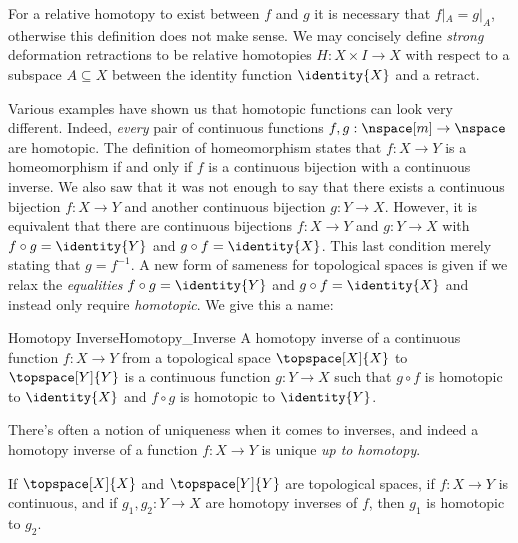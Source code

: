 \documentclass{book}                                                           %
\begin{document}
                For a relative homotopy to exist between $f$ and $g$ it is
                necessary that $f|_{A}=g|_{A}$, otherwise this definition does
                not make sense. We may concisely define \textit{strong}
                deformation retractions to be relative homotopies
                $H:X\times{I}\rightarrow{X}$ with respect to a subspace
                $A\subseteq{X}$ between the identity function $\identity{X}$ and
                a retract.
                \par\hfill\par
                Various examples have shown us that homotopic functions can look
                very different. Indeed, \textit{every} pair of continuous
                functions $f,g:\nspace[m]\rightarrow\nspace$ are homotopic. The
                definition of homeomorphism states that $f:X\rightarrow{Y}$ is
                a homeomorphism if and only if $f$ is a continuous bijection
                with a continuous inverse. We also saw that it was not enough to
                say that there exists a continuous bijection $f:X\rightarrow{Y}$
                and another continuous bijection $g:Y\rightarrow{X}$. However,
                it is equivalent that there are continuous bijections
                $f:X\rightarrow{Y}$ and $g:Y\rightarrow{X}$ with
                $f\circ{g}=\identity{Y}$ and $g\circ{f}=\identity{X}$. This last
                condition merely stating that $g=f^{\minus{1}}$. A new form of
                sameness for topological spaces is given if we relax the
                \textit{equalities} $f\circ{g}=\identity{Y}$ and
                $g\circ{f}=\identity{X}$ and instead only require
                \textit{homotopic}. We give this a name:
                \begin{fdefinition}{Homotopy Inverse}{Homotopy_Inverse}
                    A homotopy inverse of a continuous function
                    $f:X\rightarrow{Y}$ from a topological space
                    $\topspace[X]{X}$ to $\topspace[Y]{Y}$ is a continuous
                    function $g:Y\rightarrow{X}$ such that $g\circ{f}$ is
                    homotopic to $\identity{X}$ and $f\circ{g}$ is homotopic to
                    $\identity{Y}$.
                \end{fdefinition}
                There's often a notion of uniqueness when it comes to inverses,
                and indeed a homotopy inverse of a function $f:X\rightarrow{Y}$
                is unique \textit{up to homotopy}.
                \begin{theorem}
                    If $\topspace[X]{X}$ and $\topspace[Y]{Y}$ are topological
                    spaces, if $f:X\rightarrow{Y}$ is continuous, and if
                    $g_{1},g_{2}:Y\rightarrow{X}$ are homotopy inverses
                    of $f$, then $g_{1}$ is homotopic to ${g}_{2}$.
                \end{theorem}
\end{document}
